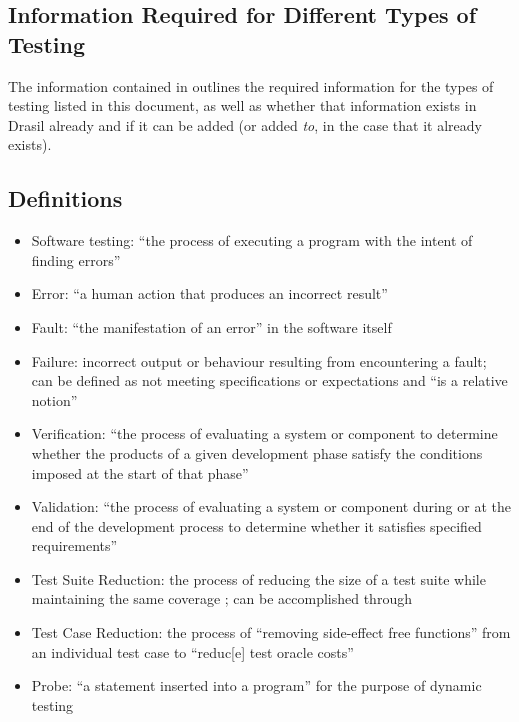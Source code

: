 \subsection{Information Required for Different Types of Testing}

The information contained in  outlines the required
information for the types of testing listed in this document, as well as
whether that information exists in Drasil already and if it can be added
(or added \emph{to}, in the case that it already exists).

\testReqsTable{}

\subsection{Definitions}

\begin{itemize}
      \item Software testing: ``the process of executing a program with the
            intent of finding errors'' \cite[p.~438]{peters_software_2000}
      \item Error: ``a human action that produces an incorrect result''
            \cite[p.~399]{van_vliet_software_2000}
      \item Fault: ``the manifestation of an error'' in the software itself
            \cite[p.~400]{van_vliet_software_2000}
      \item Failure: incorrect output or behaviour resulting from encountering
            a fault; can be defined as not meeting specifications or
            expectations and ``is a relative notion''
            \cite[p.~400]{van_vliet_software_2000}
      \item Verification: ``the process of evaluating a system or component
            to determine whether the products of a given development phase
            satisfy the conditions imposed at the start of that phase''
            \cite[p.~400]{van_vliet_software_2000}
      \item Validation: ``the process of evaluating a system or component
            during or at the end of the development process to determine
            whether it satisfies specified requirements''
            \cite[p.~400]{van_vliet_software_2000}
      \item Test Suite Reduction: the process of reducing the size of a test
            suite while maintaining the same coverage
            \cite[p.~519]{barr_oracle_2015}; can be accomplished through
      \item Test Case Reduction: the process of ``removing side-effect free
            functions'' from an individual test case to ``reduc[e] test oracle
            costs'' \cite[p.~519]{barr_oracle_2015}
      \item Probe: ``a statement inserted into a program'' for the purpose of
            dynamic testing \cite[p.~438]{peters_software_2000}
\end{itemize}

